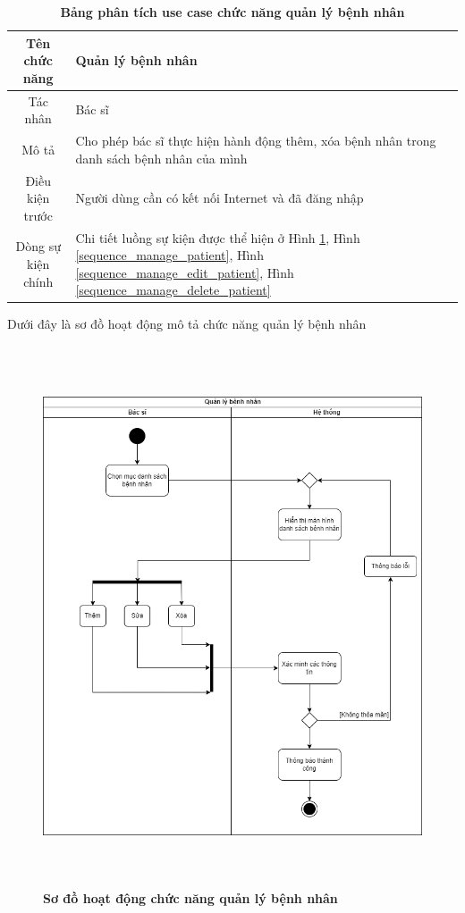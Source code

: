   \begin{table}[H]
    \caption{\bfseries \fontsize{12pt}{0pt}\selectfont Bảng phân tích use case chức năng quản lý bệnh nhân}
    \centering
    \begin{tabularx}{0.9\textwidth}{|c|X|}
      \hline
      \textbf{Tên chức năng} & \textbf{Quản lý bệnh nhân} \\
      \hline
      Tác nhân & Bác sĩ \\
      \hline
      Mô tả & Cho phép bác sĩ thực hiện hành động thêm, xóa bệnh nhân trong danh sách bệnh nhân của mình \\
      \hline
      Điều kiện trước & Người dùng cần có kết nối Internet và đã đăng nhập \\
      \hline
      Dòng sự kiện chính & 
        Chi tiết luồng sự kiện được thể hiện ở Hình \ref{activity_patient_management}, Hình \ref{sequence_manage_patient},
        Hình \ref{sequence_manage_edit_patient}, Hình \ref{sequence_manage_delete_patient}
        \\
      \hline
    \end{tabularx}
  \end{table}
  Dưới đây là sơ đồ hoạt động mô tả chức năng quản lý bệnh nhân
  \begin{figure}[H]
    \centering
    \includegraphics[width=13.5cm,height=16cm]{Images/activity/activity_manage_patient.png}
    \caption[Sơ đồ hoạt động chức năng quản lý bệnh nhân]{\bfseries \fontsize{12pt}{0pt}
    \selectfont Sơ đồ hoạt động chức năng quản lý bệnh nhân}
    \label{activity_patient_management} %
  \end{figure}

